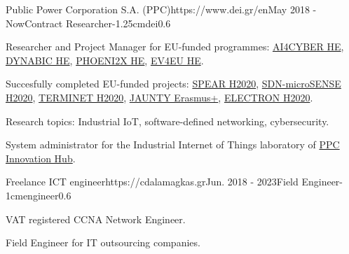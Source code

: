 \documentclass{mycv}
\begin{document}
	\vspace*{0.5cm}
	
	\begin{EntryDatedLogo}{Public Power Corporation S.A. (PPC)}{https://www.dei.gr/en}{May 2018 - Now}{Contract Researcher}{-1.25cm}{dei}{0.6}
		\begin{Itemize}
			\item Researcher and Project Manager for EU-funded programmes: \href{https://cordis.europa.eu/project/id/101070450}{AI4CYBER HE}, \href{https://cordis.europa.eu/project/id/101070455}{DYNABIC HE}, \href{https://cordis.europa.eu/project/id/101070586}{PHOENI2X HE}, \href{https://cordis.europa.eu/project/id/101056765}{EV4EU HE}.
			\item Succesfully completed EU-funded projects: \href{https://cordis.europa.eu/project/id/787011}{SPEAR H2020}, \href{https://cordis.europa.eu/project/id/833955}{SDN-microSENSE H2020}, \href{https://cordis.europa.eu/project/id/957406}{TERMINET H2020}, \href{https://www.jaunty.eu/}{JAUNTY Erasmus+}, \href{https://cordis.europa.eu/project/id/101021936}{ELECTRON H2020}.
			\item Research topics: Industrial IoT, software-defined networking, cybersecurity.
			\item System administrator for the Industrial Internet of Things laboratory of \href{https://innovationhub.dei.gr/el/}{PPC Innovation Hub}.
		\end{Itemize}
	\end{EntryDatedLogo}
	
	\vspace*{0.5cm}
	
	\begin{EntryDatedLogo}{Freelance ICT engineer}{https://cdalamagkas.gr}{Jun. 2018 - 2023}{Field Engineer}{-1cm}{engineer}{0.6}
		\begin{Itemize}
			\item VAT registered CCNA Network Engineer.
			\item Field Engineer for IT outsourcing companies.
		\end{Itemize}
	\end{EntryDatedLogo}

	\vspace*{0.5cm}	

\end{document}
